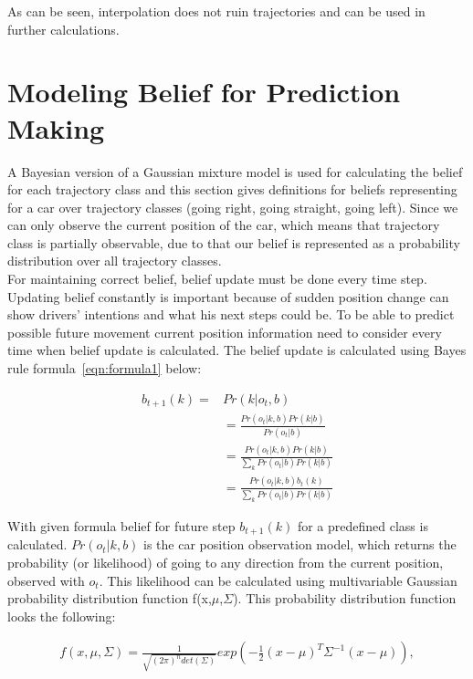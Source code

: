 As can be seen, interpolation does not ruin trajectories and can be used in further calculations.

\section{Modeling Belief for Prediction Making}

A Bayesian version of a Gaussian mixture model is used for calculating the belief for each trajectory class and this section gives definitions for beliefs representing for a car over trajectory classes (going right, going straight, going left). Since we can only observe the current position of the car, which means that trajectory class is partially observable, due to that our belief is represented as a probability distribution over all trajectory classes. \\

For maintaining correct belief, belief update must be done every time step. Updating belief constantly is important because of sudden position change can show drivers' intentions and what his next steps could be. To be able to predict possible future movement current position information need to consider every time when belief update is calculated. The belief update is calculated using Bayes rule formula~\ref{eqn:formula1} below: 

\begin{equation}
\begin{split}
b_{t+1}(k) = & \displaystyle Pr(k|o_{t}, b) \\ 
& = \displaystyle \frac{Pr(o_{t}|k, b) Pr(k|b)}{Pr(o_{t}|b)} \\
& = \displaystyle \frac{Pr(o_{t}|k, b) Pr(k|b)}{ \sum_{k} Pr(o_{t}|b) Pr(k|b)} \\
& = \displaystyle \frac{Pr(o_{t}|k, b) b_{t}(k)}{ \sum_{k} Pr(o_{t}|b) Pr(k|b)}
\end{split}
\label{eqn:formula1}
\end{equation}

With given formula belief for future step $b_{t+1}(k)$ for a predefined class is calculated. $Pr(o_{t} | k, b)$ is the car position observation model, which returns the probability (or likelihood) of going to any direction from the current position, observed with $o_{t}$. This likelihood can be calculated using multivariable Gaussian probability distribution function f(x,$\mu$,$\Sigma$). This probability distribution function looks the following:

\begin{equation}
\begin{split}
f(x,\mu,\Sigma) = \displaystyle \frac{1}{\sqrt{(2 \pi)^n det(\Sigma)}} exp(-\frac{1}{2}(x-\mu)^T\Sigma^{-1}(x-\mu)), 
\end{split}
\label{eqn:formula2}
\end{equation}

